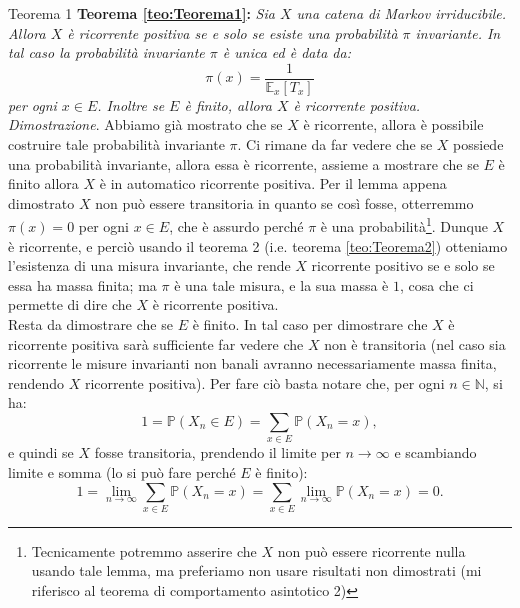\documentclass[11pt]{book}
\makeatletter
\theoremstyle{Definizione}
\theoremstyle{TeoremaProposizioneLemmaCorollario}
\theoremstyle{OsservazioneNota}
\renewenvironment{proof}[1][\proofname]{\par
  \normalfont \topsep6\p@\@plus6\p@\relax
  \trivlist
  \item[\hskip\labelsep
        \itshape
    #1\@addpunct{.}]\ignorespaces
}{%
  \endtrivlist\@endpefalse
}
\newcommand{\N}{\mathbb{N}}
\renewcommand{\P}{\mathbb{P}}
\newcommand{\E}{\mathbb{E}}
\renewenvironment{proof}{\textsl{Dimostrazione}.}{}
\makeatother
\begin{document}
\begin{boxteo}{Teorema 1}
\textbf{Teorema \ref{teo:Teorema1}:}
\textsl{Sia $X$ una catena di Markov irriducibile. Allora $X$ è ricorrente positiva se e solo se esiste una probabilità $\pi$ invariante. In tal caso la probabilità invariante $\pi$ è unica ed è data da:}
$$
\pi(x) = \frac{1}{\E_x[T_x]}
$$
\textsl{per ogni $x\in E$. Inoltre se $E$ è finito, allora $X$ è ricorrente positiva.}
\tcblower
\begin{proof}
Abbiamo già mostrato che se $X$ è ricorrente, allora è possibile costruire tale probabilità invariante $\pi$. Ci rimane da far vedere che se $X$ possiede una probabilità invariante, allora essa è ricorrente, assieme a mostrare che se $E$ è finito allora $X$ è in automatico ricorrente positiva. Per il lemma appena dimostrato $X$ non può essere transitoria in quanto se così fosse, otterremmo $\pi(x) = 0$ per ogni $x\in E$, che è assurdo perché $\pi$ è una probabilità\footnote{Tecnicamente potremmo asserire che $X$ non può essere ricorrente nulla usando tale lemma, ma preferiamo non usare risultati non dimostrati (mi riferisco al teorema di comportamento asintotico 2)}. Dunque $X$ è ricorrente, e perciò usando il teorema 2 (i.e. teorema \ref{teo:Teorema2}) otteniamo l'esistenza di una misura invariante, che rende $X$ ricorrente positivo se e solo se essa ha massa finita; ma $\pi$ è una tale misura, e la sua massa è $1$, cosa che ci permette di dire che $X$ è ricorrente positiva.\\
Resta da dimostrare che se $E$ è finito. In tal caso per dimostrare che $X$ è ricorrente positiva sarà sufficiente far vedere che $X$ non è transitoria (nel caso sia ricorrente le misure invarianti non banali avranno necessariamente massa finita, rendendo $X$ ricorrente positiva). Per fare ciò basta notare che, per ogni $n\in \N$, si ha:
$$
1 = \P (X_n \in E) = \sum_{x\in E} \P(X_n = x),
$$
e quindi se $X$ fosse transitoria, prendendo il limite per $n\to\infty$ e scambiando limite e somma (lo si può fare perché $E$ è finito):
$$
1 = \lim_{n \to\infty} \sum_{x\in E} \P(X_n = x) = \sum_{x\in E} \lim_{n\to\infty} \P(X_n = x) = 0.
$$
\end{proof}
\end{boxteo}
\end{document}
